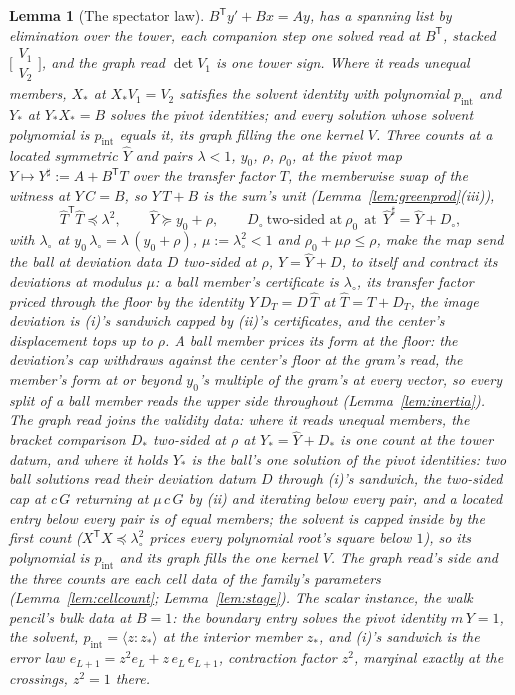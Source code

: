 \documentclass[11pt]{article}
\newtheorem{lemma}{Lemma}
\theoremstyle{definition}
\begin{document}
\begin{lemma}[The spectator law]
$B^{\mathsf T}y'+Bx=Ay$,
has a spanning list by elimination over the tower, each companion
step one solved read at $B^{\mathsf T}$, stacked
$\big[\begin{smallmatrix}V_1\\V_2\end{smallmatrix}\big]$, and the
\emph{graph read} $\det V_1$ is one tower sign. Where it reads
unequal members, $X_*$ at $X_*V_1=V_2$ satisfies the solvent identity
with polynomial $p_{\mathrm{int}}$ and $Y_*$ at $Y_*X_*=B$ solves
the pivot identities; and every solution whose solvent polynomial is
$p_{\mathrm{int}}$ equals it, its graph filling the one kernel $V$.
Three counts at a located symmetric $\hat Y$ and pairs
$\lambda<1$, $y_0$, $\rho$, $\rho_0$, at the \emph{pivot map}
$Y\mapsto Y^{\sharp}:=A+B^{\mathsf T}T$ over the transfer factor $T$,
the memberwise swap of the witness at $Y\,C=B$, so $Y\,T+B$ is the
sum's unit (Lemma~\ref{lem:greenprod}(iii)),
\[
\hat T^{\mathsf T}\hat T\preceq\lambda^2,
\qquad
\hat Y\succeq y_0+\rho,
\qquad
D_\circ\ \text{two-sided at}\ \rho_0\ \ \text{at}\ \ \hat Y^{\sharp}=\hat Y+D_\circ ,
\]
with $\lambda_\circ$ at $y_0\,\lambda_\circ=\lambda\,(y_0+\rho)$,
$\mu:=\lambda_\circ^2<1$
and $\rho_0+\mu\rho\le\rho$, make the map send the ball at deviation
data $D$ two-sided at $\rho$, $Y=\hat Y+D$, to itself and contract its
deviations at
modulus $\mu$: a ball member's certificate is $\lambda_\circ$, its
transfer factor priced through the floor by the identity
$Y\,D_T=D\,\hat T$ at $\hat T=T+D_T$, the image
deviation is (i)'s sandwich capped by (ii)'s certificates, and the
center's displacement tops up to $\rho$. A ball member prices its
form at the floor: the deviation's cap withdraws against the
center's floor at the gram's read, the member's form at or beyond
$y_0$'s multiple of the gram's at every vector, so every split of
a ball member reads the upper side throughout
(Lemma~\ref{lem:inertia}). The graph read joins the
validity data: where it reads unequal members, the bracket comparison
$D_*$ two-sided at $\rho$ at $Y_*=\hat Y+D_*$ is one count at the tower datum, and where
it holds $Y_*$ is the ball's one solution of the pivot identities: two ball
solutions read their deviation datum $D$ through (i)'s sandwich, the
two-sided cap at $c\,G$ returning at $\mu\,c\,G$ by (ii) and
iterating below every pair, and a located entry below every
pair is of equal members; the solvent is capped inside by
the first count ($X^{\mathsf T}X\preceq\lambda_\circ^2$ prices every
polynomial root's square below $1$), so its polynomial is
$p_{\mathrm{int}}$ and its graph fills the one kernel $V$. The graph
read's side and the three counts are each cell data of the family's
parameters (Lemma~\ref{lem:cellcount}; Lemma~\ref{lem:stage}). The scalar instance, the walk pencil's bulk data at $B=1$: the
boundary entry solves the pivot identity $m\,Y=1$, the
solvent, $p_{\mathrm{int}}=\langle z\!:\!z_*\rangle$ at the
interior member $z_*$, and
(i)'s sandwich is the error law $e_{L+1}=z^2e_L+z\,e_L\,e_{L+1}$,
contraction factor $z^2$, marginal exactly at the crossings,
$z^2=1$ there.
\end{lemma}
\end{document}
